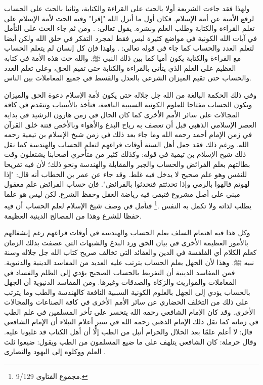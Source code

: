 ولهذا فقد جاءت الشريعة أولا بالحث على القراءة والكتابة، وثانيا بالحث على الحساب لرفع الأمية عن أمة الإسلام. فكان أول ما أنزل الله "إقرا" وفيه الحث لأمة الإسلام على تعلم القراءة والكتابة وطلب العلم ونشره.
يقول تعالى:
\quranayah*[96][1-5]{\footnotesize \surahname*[96]}.
ومن ثم جاء الحث على التأمل في آيات الله الكونية في مواضع كثيرة ليس فقط لمجرد التفكر في خلق الله ولكن أيضا لتعلم العدد والحساب كما جاء في قوله تعالى:
\quranayah*[10][5]{\footnotesize \surahname*[10]}. ولهذا فإن كل إنسان لم يتعلم الحساب مع القراءة والكتابة يكون أميا كما بين ذلك النبي ﷺ. والله حث هذه الأمة في كتابه العظيم على العلم الذي يتأتى بالقراءة والكتابة حتى تقيم الحق، وعلى تعلم العدد والحساب حتى تقيم الميزان الشرعي بالعدل والقسط في جميع المعاملات بين الناس. 

وفي ذلك الحكمة البالغة من الله جل جلاله حتى يكون لأمة الإسلام دعوة الحق والميزان ويكون الحساب مفتاحا للعلوم الكونية السببية النافعة، فتأخذ بالأسباب وتتقدم في كافة المجالات على سائر الأمم الأخرى كما كان الحال في زمن هارون الرشيد في بداية العصر الإسلامي الذهبي قبل أن تعصف به رياح البدع والأهواء وبالأخص فتنة خلق القرآن في زمن الإمام أحمد رحمه الله وما جاء بعد ذلك في زمن شيخ الإسلام بن تيمية رحمه الله. ورغم ذلك فقد جعل أهل السنة أوقات فراغهم لتعلم الحساب والهندسة كما نقل ذلك شيخ الإسلام بن تيمية في قوله: وكذلك كثير من متأخري أصحابنا يشتغلون وقت بطالتهم بعلم الفرائض والحساب والجبر والمقابلة والهندسة ونحو ذلك؛ لأن فيه تفريحا للنفس وهو علم صحيح لا يدخل فيه غلط. وقد جاء عن عمر بن الخطاب أنه قال: "إذا لهوتم فالهوا بالرمي وإذا تحدثتم فتحدثوا بالفرائض". فإن حساب الفرائض علم معقول مبني على أصل مشروع فتبقى فيه رياضة العقل وحفظ الشرع. لكن ليس هو علما يطلب لذاته ولا تكمل به النفس \href{https://shamela.ws/book/7289/4394#p1}{\faExternalLink} \cite{ibnTaimia_Majmoo}.\footnote{مجموع الفتاوى 9/129.} فتأمل في وصف شيخ الإسلام لعلم الحساب أن فيه حفظا للشرع وهذا من المصالح الدينية العظيمة.

وكل هذا فيه اهتمام السلف بعلم الحساب والهندسة في أوقات فراغهم رغم إنشغالهم بالأمور العظيمة الأخرى في بيان الحق ورد البدع والشبهات التي عصفت بذلك الزمان كعلم الكلام أي الفلفسة في الدين والعقائد التي تخالف صريح كتاب الله جل جلاله وسنة نبيه ﷺ. وهذا لأن الجهل بعلم الحساب يترتب عليه العديد من المفاسد الدينية والدنيوية. فمن المفاسد الدينية أن التفريط بالحساب الصحيح يؤدي إلى الظلم والفساد في المعاملات والمواريث والزكاة والصدقات وغيرها. ومن المفاسد الدنيوية أن الجهل بالحساب يؤدي إلى الجهل بالعلوم الكونية السببية النافعة كالهندسة والطب وما يترتب على ذلك من التخلف الحضاري عن سائر الأمم الأخرى في كافة الصناعات والمجالات الأخرى. وقد كان الإمام الشافعي رحمه الله يتحسر على تأخر المسلمين في علم الطب في زمانه كما نقل ذلك الإمام الذهبي رحمه الله في سير أعلام النبلاء أن الإمام الشافعي قال: لا أعلم علمًا بعد الحلال والحرام أنبل من الطب إلَّا أن أهل الكتاب قد غلبونا عليه. وقال حرملة: كان الشافعي يتلهف على ما ضيع المسلمون من الطب ويقول: ضيعوا ثلث العلم ووكلوه إلى اليهود والنصارى \href{https://shamela.ws/book/22669/4486#p7}{\faExternalLink} \cite{dahabi_Siyar}.

